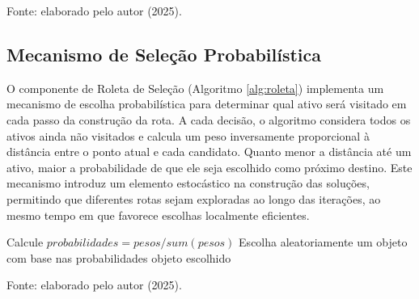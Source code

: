 \begin{algorithm}[H]
\caption{Melhor Rota}
\label{alg:melhor-rota}

\end{algorithm}
\begin{flushleft}
\small{Fonte: elaborado pelo autor (2025).}
\end{flushleft}

\subsection{Mecanismo de Seleção Probabilística}

O componente de Roleta de Seleção (Algoritmo \ref{alg:roleta}) implementa um mecanismo de escolha probabilística para 
determinar qual ativo será visitado em cada passo da construção da rota. A cada decisão, 
o algoritmo considera todos os ativos ainda não visitados e calcula um peso inversamente 
proporcional à distância entre o ponto atual e cada candidato. Quanto menor a distância até 
um ativo, maior a probabilidade de que ele seja escolhido como próximo destino. Este mecanismo 
introduz um elemento estocástico na construção das soluções, permitindo que diferentes rotas 
sejam exploradas ao longo das iterações, ao mesmo tempo em que favorece escolhas localmente 
eficientes.

\begin{algorithm}[H]
\caption{Roleta de Seleção}
\label{alg:roleta}


Calcule $probabilidades = pesos / sum(pesos)$\;
Escolha aleatoriamente um objeto com base nas probabilidades\;
\Return objeto escolhido\;

\end{algorithm}
\begin{flushleft}
\small{Fonte: elaborado pelo autor (2025).}
\end{flushleft}


